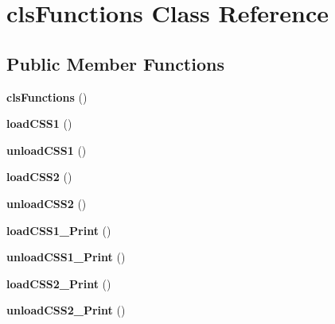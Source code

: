 \hypertarget{classclsFunctions}{
\section{clsFunctions Class Reference}
\label{classclsFunctions}
}
\subsection*{Public Member Functions}
\begin{DoxyCompactItemize}
\item 
\hypertarget{classclsFunctions_ae44809d49334b5c385b7fd4b1e0d195c}{
{\bfseries clsFunctions} ()}
\label{classclsFunctions_ae44809d49334b5c385b7fd4b1e0d195c}

\item 
\hypertarget{classclsFunctions_a6af9864b8cf3b37222c35fc0ab096169}{
{\bfseries loadCSS1} ()}
\label{classclsFunctions_a6af9864b8cf3b37222c35fc0ab096169}

\item 
\hypertarget{classclsFunctions_a67814b64ee7a66cc8271a0edf91c5579}{
{\bfseries unloadCSS1} ()}
\label{classclsFunctions_a67814b64ee7a66cc8271a0edf91c5579}

\item 
\hypertarget{classclsFunctions_a074a5bb992e077d623e2a096b593f873}{
{\bfseries loadCSS2} ()}
\label{classclsFunctions_a074a5bb992e077d623e2a096b593f873}

\item 
\hypertarget{classclsFunctions_a9f05c710fa25a33d7fd91757262c1d1e}{
{\bfseries unloadCSS2} ()}
\label{classclsFunctions_a9f05c710fa25a33d7fd91757262c1d1e}

\item 
\hypertarget{classclsFunctions_ad8f9ff0cfbb23c99c2925c9a7a1e2b25}{
{\bfseries loadCSS1\_\-Print} ()}
\label{classclsFunctions_ad8f9ff0cfbb23c99c2925c9a7a1e2b25}

\item 
\hypertarget{classclsFunctions_ae01c2807f5c7a0548f111ca2c15919c7}{
{\bfseries unloadCSS1\_\-Print} ()}
\label{classclsFunctions_ae01c2807f5c7a0548f111ca2c15919c7}

\item 
\hypertarget{classclsFunctions_affd6ae2d0332ea9332c397657ec32d8f}{
{\bfseries loadCSS2\_\-Print} ()}
\label{classclsFunctions_affd6ae2d0332ea9332c397657ec32d8f}

\item 
\hypertarget{classclsFunctions_a5d66e381f933e6c882fe7b23e2f71654}{
{\bfseries unloadCSS2\_\-Print} ()}
\label{classclsFunctions_a5d66e381f933e6c882fe7b23e2f71654}


\end{DoxyCompactItemize}
